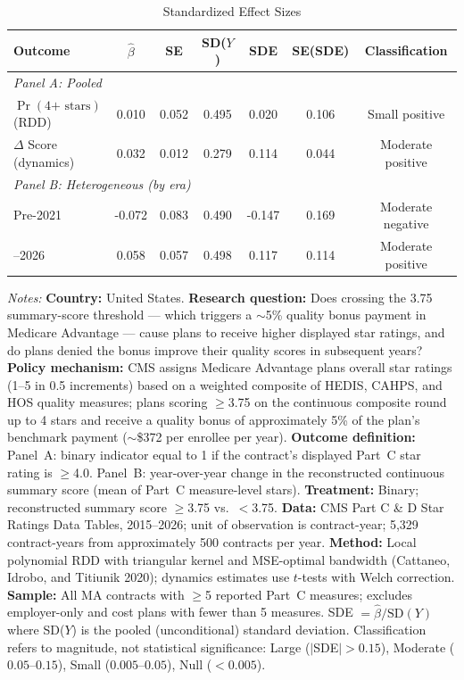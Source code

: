 \begin{table}[t]
\centering
\caption{Standardized Effect Sizes}
\label{tab:sde}
\begin{threeparttable}
\begin{tabular}{lcccccc}
\hline\hline
Outcome & $\hat{\beta}$ & SE & SD($Y$) & SDE & SE(SDE) & Classification \\
\hline
\multicolumn{7}{l}{\textit{Panel A: Pooled}} \\[3pt]
$\Pr(\text{4+ stars})$ (RDD) & 0.010 & 0.052 & 0.495 & 0.020 & 0.106 & Small positive \\
$\Delta$ Score (dynamics) & 0.032 & 0.012 & 0.279 & 0.114 & 0.044 & Moderate positive \\
\hline
\multicolumn{7}{l}{\textit{Panel B: Heterogeneous (by era)}} \\[3pt]
\quad Pre-2021 & -0.072 & 0.083 & 0.490 & -0.147 & 0.169 & Moderate negative \\
\quad 2021--2026 & 0.058 & 0.057 & 0.498 & 0.117 & 0.114 & Moderate positive \\
\hline\hline
\end{tabular}
\begin{tablenotes}
\item \textit{Notes:} \textbf{Country:} United States. \textbf{Research question:} Does crossing the 3.75 summary-score threshold --- which triggers a $\sim$5\% quality bonus payment in Medicare Advantage --- cause plans to receive higher displayed star ratings, and do plans denied the bonus improve their quality scores in subsequent years? \textbf{Policy mechanism:} CMS assigns Medicare Advantage plans overall star ratings (1--5 in 0.5 increments) based on a weighted composite of HEDIS, CAHPS, and HOS quality measures; plans scoring $\geq$3.75 on the continuous composite round up to 4 stars and receive a quality bonus of approximately 5\% of the plan's benchmark payment ($\sim$\$372 per enrollee per year). \textbf{Outcome definition:} Panel~A: binary indicator equal to 1 if the contract's displayed Part~C star rating is $\geq$4.0. Panel~B: year-over-year change in the reconstructed continuous summary score (mean of Part~C measure-level stars). \textbf{Treatment:} Binary; reconstructed summary score $\geq$3.75 vs.\ $<$3.75. \textbf{Data:} CMS Part C \& D Star Ratings Data Tables, 2015--2026; unit of observation is contract-year; 5,329 contract-years from approximately 500 contracts per year. \textbf{Method:} Local polynomial RDD with triangular kernel and MSE-optimal bandwidth (Cattaneo, Idrobo, and Titiunik 2020); dynamics estimates use $t$-tests with Welch correction. \textbf{Sample:} All MA contracts with $\geq$5 reported Part~C measures; excludes employer-only and cost plans with fewer than 5 measures. SDE $= \hat{\beta} / \text{SD}(Y)$ where SD($Y$) is the pooled (unconditional) standard deviation. Classification refers to magnitude, not statistical significance: Large ($|$SDE$| > 0.15$), Moderate ($0.05$--$0.15$), Small ($0.005$--$0.05$), Null ($< 0.005$).
\end{tablenotes}
\end{threeparttable}
\end{table}
